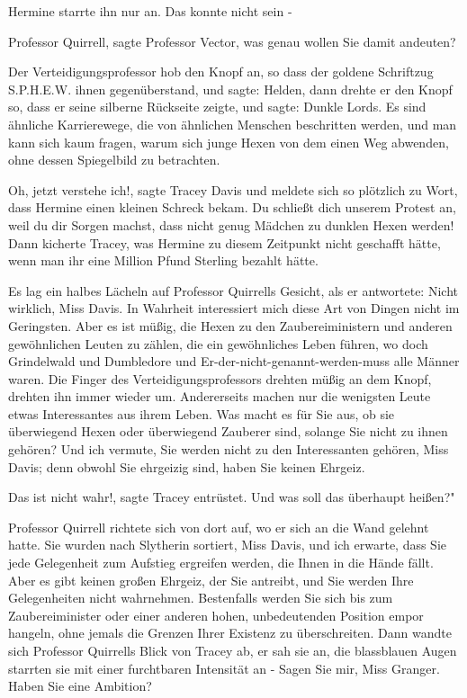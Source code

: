 Hermine starrte ihn nur an. Das konnte nicht sein -

\glqq Professor Quirrell\grqq{}, sagte Professor Vector, \glqq was genau wollen
Sie damit andeuten?\grqq{}

Der Verteidigungsprofessor hob den Knopf an, so dass der goldene Schriftzug
S.P.H.E.W. ihnen gegenüberstand, und sagte: \glqq Helden\grqq{}, dann drehte er
den Knopf so, dass er seine silberne Rückseite zeigte, und sagte: \glqq Dunkle
Lords. Es sind ähnliche Karrierewege, die von ähnlichen Menschen beschritten
werden, und man kann sich kaum fragen, warum sich junge Hexen von dem einen Weg
abwenden, ohne dessen Spiegelbild zu betrachten.\grqq{}

\glqq Oh, jetzt verstehe ich!\grqq{}, sagte Tracey Davis und meldete sich so
plötzlich zu Wort, dass Hermine einen kleinen Schreck bekam. \glqq Du schließt
dich unserem Protest an, weil du dir Sorgen machst, dass nicht genug Mädchen zu
dunklen Hexen werden!\grqq{} Dann kicherte Tracey, was Hermine zu diesem
Zeitpunkt nicht geschafft hätte, wenn man ihr eine Million Pfund Sterling
bezahlt hätte.

Es lag ein halbes Lächeln auf Professor Quirrells Gesicht, als er antwortete:
\glqq Nicht wirklich, Miss Davis. In Wahrheit interessiert mich diese Art von
Dingen nicht im Geringsten. Aber es ist müßig, die Hexen zu den
Zaubereiministern und anderen gewöhnlichen Leuten zu zählen, die ein
gewöhnliches Leben führen, wo doch Grindelwald und Dumbledore und
Er-der-nicht-genannt-werden-muss alle Männer waren.\grqq{} Die Finger des
Verteidigungsprofessors drehten müßig an dem Knopf, drehten ihn immer wieder um.
\glqq Andererseits machen nur die wenigsten Leute etwas Interessantes aus ihrem
Leben. Was macht es für Sie aus, ob sie überwiegend Hexen oder überwiegend
Zauberer sind, solange Sie nicht zu ihnen gehören? Und ich vermute, Sie werden
nicht zu den Interessanten gehören, Miss Davis; denn obwohl Sie ehrgeizig sind,
haben Sie keinen Ehrgeiz.\grqq{}

\glqq Das ist nicht wahr!\grqq{}, sagte Tracey entrüstet. \glqq Und was soll das
überhaupt heißen?"

Professor Quirrell richtete sich von dort auf, wo er sich an die Wand gelehnt
hatte. \glqq Sie wurden nach Slytherin sortiert, Miss Davis, und ich erwarte,
dass Sie jede Gelegenheit zum Aufstieg ergreifen werden, die Ihnen in die Hände
fällt. Aber es gibt keinen großen Ehrgeiz, der Sie antreibt, und Sie werden Ihre
Gelegenheiten nicht wahrnehmen. Bestenfalls werden Sie sich bis zum
Zaubereiminister oder einer anderen hohen, unbedeutenden Position empor hangeln,
ohne jemals die Grenzen Ihrer Existenz zu überschreiten.\grqq{} Dann wandte sich
Professor Quirrells Blick von Tracey ab, er sah sie an, die blassblauen Augen
starrten sie mit einer furchtbaren Intensität an - \glqq Sagen Sie mir, Miss
Granger. Haben Sie eine Ambition?\grqq{}

